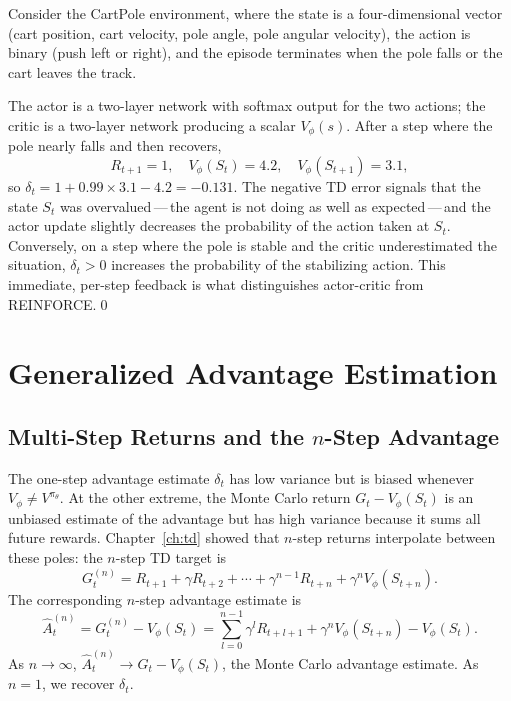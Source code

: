\begin{example}
\label{ex:cartpole-ac}
Consider the CartPole environment, where the state is a four-dimensional
vector (cart position, cart velocity, pole angle, pole angular velocity),
the action is binary (push left or right), and the episode terminates when
the pole falls or the cart leaves the track.

The actor is a two-layer network with softmax output for the two actions;
the critic is a two-layer network producing a scalar $V_\phi(s)$.  After a
step where the pole nearly falls and then recovers,
\[
R_{t+1} = 1,\quad V_\phi(S_t) = 4.2,\quad V_\phi(S_{t+1}) = 3.1,
\]
so $\delta_t = 1 + 0.99 \times 3.1 - 4.2 = -0.131$.  The negative TD error
signals that the state $S_t$ was overvalued\,---\,the agent is not doing as
well as expected\,---\,and the actor update slightly decreases the
probability of the action taken at $S_t$.  Conversely, on a step where the
pole is stable and the critic underestimated the situation,
$\delta_t > 0$ increases the probability of the stabilizing action.  This
immediate, per-step feedback is what distinguishes actor-critic from
REINFORCE.\qed
\end{example}

\section{Generalized Advantage Estimation}
\label{sec:gae-ch9}

\subsection{Multi-Step Returns and the $n$-Step Advantage}

The one-step advantage estimate $\delta_t$ has low variance but is biased
whenever $V_\phi \neq V^{\pi_\theta}$.  At the other extreme, the Monte Carlo
return $G_t - V_\phi(S_t)$ is an unbiased estimate of the advantage but has
high variance because it sums all future rewards.  Chapter~\ref{ch:td}
showed that $n$-step returns interpolate between these poles: the
$n$-step TD target is
\[
G_t^{(n)} = R_{t+1} + \gamma R_{t+2} + \cdots + \gamma^{n-1}R_{t+n}
             + \gamma^n V_\phi(S_{t+n}).
\]
The corresponding $n$-step advantage estimate is
\begin{equation}
\label{eq:n-step-advantage}
\hat{A}_t^{(n)}
= G_t^{(n)} - V_\phi(S_t)
= \sum_{l=0}^{n-1} \gamma^l R_{t+l+1} + \gamma^n V_\phi(S_{t+n})
  - V_\phi(S_t).
\end{equation}
As $n \to \infty$, $\hat{A}_t^{(n)} \to G_t - V_\phi(S_t)$, the Monte Carlo
advantage estimate.  As $n = 1$, we recover $\delta_t$.


